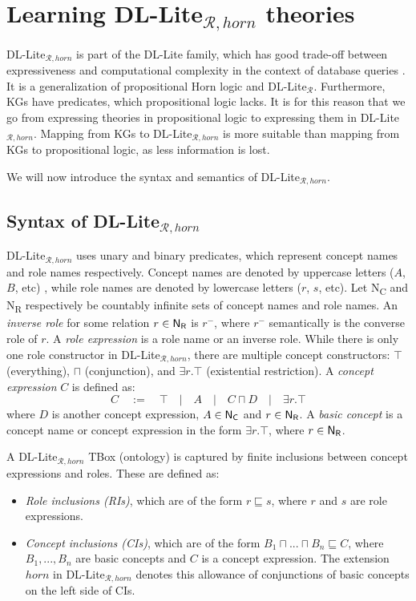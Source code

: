 \chapter{Learning DL-Lite$_{\mathcal{R}, horn}$ theories}

DL-Lite$_{\mathcal{R}, horn}$ is part of the DL-Lite family, which has good trade-off between expressiveness and computational complexity in the context of database queries \cite{borgida2008explanation}. It is a generalization of propositional Horn logic and DL-Lite$_{\mathcal{R}}$. Furthermore, KGs have predicates, which propositional logic lacks. It is for this reason that we go from expressing theories in propositional logic to expressing them in  DL-Lite$_{\mathcal{R}, horn}$. Mapping from KGs to DL-Lite$_{\mathcal{R}, horn}$ is more suitable than mapping from KGs to propositional logic, as less information is lost. 

We will now introduce the syntax and semantics of DL-Lite$_{\mathcal{R}, horn}$.

\section{Syntax of DL-Lite$_{\mathcal{R}, horn}$}
DL-Lite$_{\mathcal{R}, horn}$ uses unary and binary predicates, which represent concept names and role names respectively. Concept names are denoted by uppercase letters ($A$, $B$, etc) , while role names are denoted by lowercase letters ($r$, $s$, etc). Let \textsf{N\textsubscript{C}} and \textsf{N\textsubscript{R}} respectively be countably infinite sets of concept names and role names. An \emph{inverse role} for some relation $r \in \textsf{N\textsubscript{R}}$ is $r^-$, where $r^-$ semantically is the converse role of $r$. A \emph{role expression} is a role name or an inverse role. While there is only one role constructor in DL-Lite$_{\mathcal{R}, horn}$, there are multiple concept constructors: $\top$ (everything), $\sqcap$ (conjunction), and $\exists r.\top$ (existential restriction). A \emph{concept expression} $C$ is defined as:
\[C \quad:=\quad \top\quad|\quad A \quad|\quad C\sqcap D\quad |\quad \exists r.\top\]
where $D$ is another concept expression, $A\in \textsf{N\textsubscript{C}}$ and $r \in \textsf{N\textsubscript{R}}$. A \emph{basic concept} is a concept name or concept expression in the form $\exists r.\top$, where $r \in \textsf{N\textsubscript{R}}$. 

A DL-Lite$_{\mathcal{R}, horn}$ TBox (ontology) is captured by finite inclusions between concept expressions and roles. These are defined as: 
\begin{itemize}
    \setlength\itemsep{1em}
    \item \emph{Role inclusions (RIs)}, which are of the form $r\sqsubseteq s$, where $r$ and $s$ are role expressions.
    \item \emph{Concept inclusions (CIs)}, which are of the form $B_1 \sqcap ... \sqcap B_n \sqsubseteq C$, where $B_1, ..., B_n$ are basic concepts and $C$ is a concept expression. The extension $horn$ in DL-Lite$_{\mathcal{R}, horn}$ denotes this allowance of conjunctions of basic concepts on the left side of CIs.
\end{itemize}

